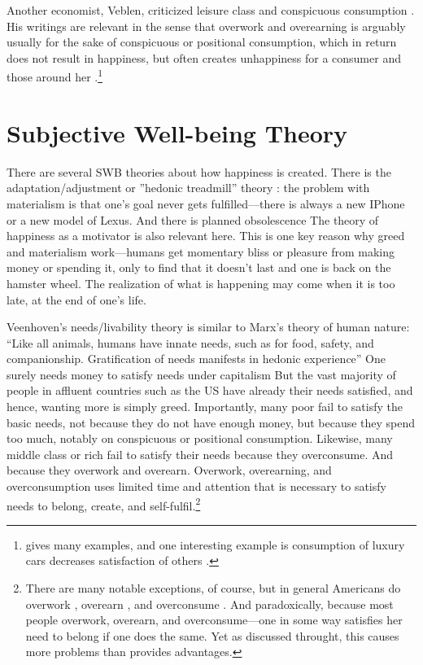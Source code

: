\documentclass[10pt, letterpaper]{article}
\begin{document}
\begin{spacing}{1.8}
Another economist, Veblen, criticized leisure class and conspicuous consumption
\citep{veblen05a,veblen05b}. His writings are relevant in the sense that overwork
and overearning is arguably usually for the sake of conspicuous or positional
consumption, which in return does not result in happiness, but often creates
unhappiness for a consumer and those around her
\citep{frank12,frank_nyt_mar_20_14,frank08,frank04,kasser13,schmuck00}.\footnote{\citet{frank12} gives many examples, and one interesting example is consumption of luxury cars decreases satisfaction of others \citep{winkelmann12}.}


\section{Subjective Well-being Theory}

There are several SWB theories about how happiness is created. There is the adaptation/adjustment or ''hedonic treadmill'' theory \citep{brickman78cj}: the problem with materialism is that one's goal never gets fulfilled---there is
always a new IPhone or a new model of Lexus. And there is planned obsolescence \citep{satyro2018planned,agrawal2016limits} %
%
The theory of happiness as a motivator \citep{carver90} is also relevant
here. This is one key reason why greed and materialism  work---humans get
momentary bliss or pleasure from making money or spending it, only to find that
it doesn't last and one is back on the hamster wheel. The realization of
what is happening may come when it is too late, at the end of one's life.

Veenhoven's needs/livability theory is similar to Marx's theory of human nature:
``Like all animals, humans have innate needs, such as for food, safety, and
companionship. Gratification of needs manifests in hedonic
experience''\citep[][p. 3645]{veenhoven14b}
One surely needs money to satisfy needs under capitalism But the vast majority
of people in affluent countries such as the US have already their needs
satisfied, and hence, wanting more is simply greed. Importantly, many poor fail
to satisfy the basic needs, not because they do not have enough money, but because they spend too much, notably on conspicuous or positional consumption. 
%
Likewise, many middle class or rich fail to satisfy their needs because
they overconsume. And  because they overwork and overearn. Overwork,
overearning, and overconsumption uses limited time and attention that is
necessary to satisfy needs to belong, create, and self-fulfil.\footnote{There
  are many notable exceptions, of course, but in general Americans do overwork \citep{aokditella},
  overearn \cite{hsee13}, and overconsume \cite{kasser13}. And paradoxically,
  because most people overwork, overearn, and overconsume---one in some way
  satisfies her need to belong if one does the same. Yet as discussed throught,
  this causes more problems than provides advantages.}  


\end{spacing}
\end{document}
